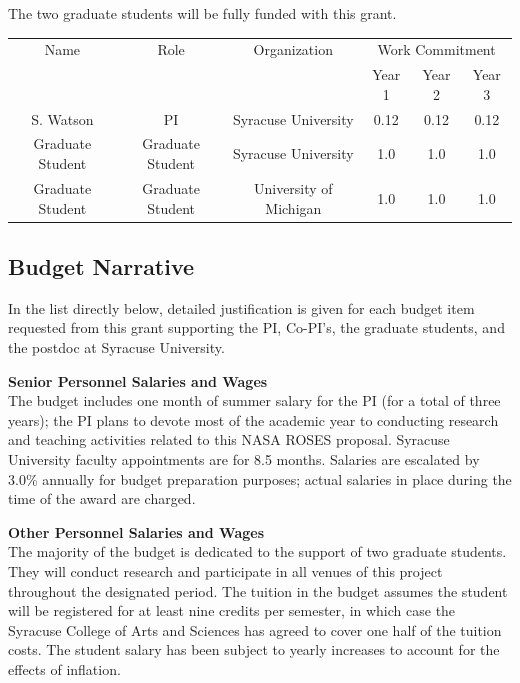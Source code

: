 \documentclass[useAMS,12pt]{article}
\begin{document}
The two graduate students will be fully funded with this grant.

\begin{center}
\begin{tabular}{|c|c|c|c|c|c|}
\hline\hline
Name  & Role & Organization &\multicolumn{3}{|c|}{Work Commitment}\\
&&& Year 1 & Year 2 & Year 3 \\\hline
S. Watson  & PI & Syracuse University & 0.12 & 0.12 & 0.12 \\
Graduate Student     & Graduate Student        & Syracuse University  & 1.0 & 1.0 & 1.0 \\
Graduate Student     & Graduate Student        & University of Michigan  & 1.0 & 1.0 & 1.0 \\
\hline
\end{tabular}
\end{center}

\subsection{Budget Narrative}
In the list directly below, detailed justification is given for each budget item requested from this grant supporting the PI, Co-PI's, the graduate students, and the postdoc at Syracuse University.
\smallskip

{\bf Senior Personnel Salaries and Wages}\\
The budget includes one month of summer salary for the PI (for a total of three
years); the PI plans to devote most of the academic year to conducting research and
teaching activities related to this NASA ROSES proposal.
Syracuse University faculty appointments are for 8.5 months.  Salaries are escalated by 3.0\%
annually for budget preparation purposes; actual salaries in place during the time of the award are charged.
\smallskip

{\bf Other Personnel Salaries and Wages}\\
The majority of the budget is dedicated to the support of two graduate students.
They will conduct research and participate in all venues of
this project throughout the designated period.
The tuition in the budget assumes the student will be registered for at least nine credits per semester, in which case
the Syracuse College of Arts and Sciences has agreed to cover one half of the tuition costs.
The student salary has been subject to yearly increases to account for the effects of inflation.
\smallskip
\end{document}
